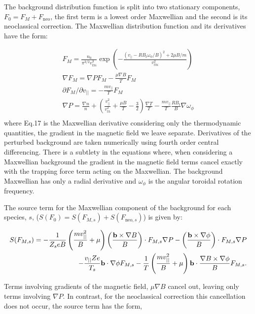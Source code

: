 The background distribution function is split into two stationary components, $F_0 = F_{M} + F_{\mbox{neo}}$, the first term is a lowest order Maxwellian and the second is its neoclassical correction.  The Maxwellian distribution function and its derivatives have the form:

\begin{eqnarray}
F_{M} = \frac{n_{0}}{\pi^{3/2}v_{th i}^{3}}\exp{\left(-\frac{(v_{||}-RB_{t}\omega_{\phi}/B)^{2} + 2\mu B/m}{v_{th i}^{2}}\right)}\\
\nabla F_{M} = \nabla P F_{M} - \frac{\mu\nabla B}{T}F_{M} \\
\partial F_{M}/\partial v_{||} = -\frac{mv_{||}}{T}F_{M} \\
\nabla P = \frac{\nabla n}{n} + \left(\frac{v_{||}^{2}}{v_{th}^{2}} + \frac{\mu B}{T} - \frac{3}{2}\right)\frac{\nabla T}{T} - \frac{mv_{||}}{T}\frac{RB_{t}}{B}\nabla\omega_{\phi} \nonumber\\
\end{eqnarray}
where Eq.17 is the Maxwellian derivative considering only the thermodynamic quantities, the gradient in the magnetic field we leave separate.  Derivatives of the perturbed background are taken numerically using fourth order central differencing.  There is a subtlety in the equations where, when considering a Maxwellian background the gradient in the magnetic field terms cancel 
exactly with the trapping force term acting on the Maxwellian. 
The background Maxwellian has only a radial derivative and $\omega_{\phi}$ is the angular toroidal rotation frequency.

The source term for the Maxwellian component of the background for each species, $s$, ($S(F_{0}) = S(F_{M,s})+S(F_{\mbox{neo},s})$) is given by:

\begin{eqnarray}
S(F_{M,s}) = -\frac{1}{Z_{s}eB}\left(\frac{mv_{||}^{2}}{B}+\mu\right)\left(\frac{{\bf b}\times\nabla B}{B}\right)\cdot F_{M,s}\nabla P -\left(\frac{{\bf b}\times\nabla \phi}{B}\right)\cdot F_{M,s}\nabla P \nonumber\\
-\frac{v_{||}Ze}{T_{s}}{\bf b}\cdot\nabla\phi F_{M,s} -\frac{1}{T}\left(\frac{mv_{||}^{2}}{B}+\mu\right){\bf b}\cdot\frac{\nabla B\times\nabla\phi}{B}F_{M,s}.
\end{eqnarray}
 
Terms involving gradients of the magnetic field, $\mu\nabla B$  cancel out, leaving only terms involving $\nabla P$.  In contrast, for the neoclassical correction this cancellation does not occur, the source term has the form,

